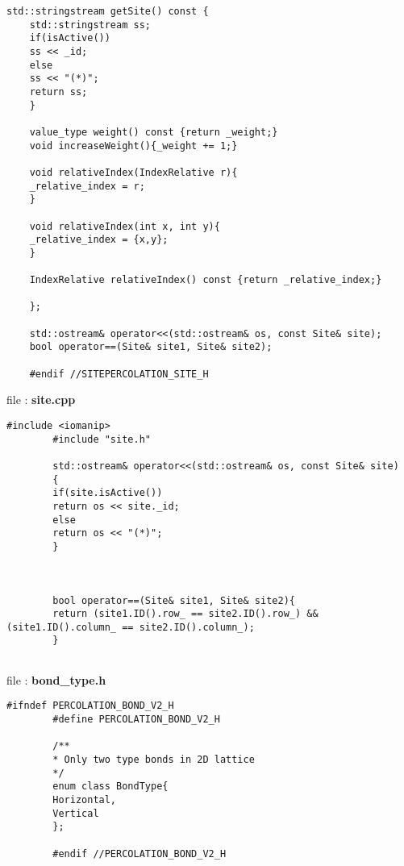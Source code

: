 \begin{lstlisting}[style=CStyle]
	std::stringstream getSite() const {
	std::stringstream ss;
	if(isActive())
	ss << _id;
	else
	ss << "(*)";
	return ss;
	}
	
	value_type weight() const {return _weight;}
	void increaseWeight(){_weight += 1;}
	
	void relativeIndex(IndexRelative r){
	_relative_index = r;
	}
	
	void relativeIndex(int x, int y){
	_relative_index = {x,y};
	}
	
	IndexRelative relativeIndex() const {return _relative_index;}
	
	};
	
	std::ostream& operator<<(std::ostream& os, const Site& site);
	bool operator==(Site& site1, Site& site2);
	
	#endif //SITEPERCOLATION_SITE_H
	\end{lstlisting}
	
	file : \textbf{site.cpp}
	\begin{lstlisting}[style=CStyle]
		#include <iomanip>
		#include "site.h"
		
		std::ostream& operator<<(std::ostream& os, const Site& site)
		{
		if(site.isActive())
		return os << site._id;
		else
		return os << "(*)";
		}
		
		
		
		bool operator==(Site& site1, Site& site2){
		return (site1.ID().row_ == site2.ID().row_) && (site1.ID().column_ == site2.ID().column_);
		}
		
	\end{lstlisting}
	
	
	file : \textbf{bond\_type.h}
	\begin{lstlisting}[style=CStyle]	
		#ifndef PERCOLATION_BOND_V2_H
		#define PERCOLATION_BOND_V2_H
		
		/**
		* Only two type bonds in 2D lattice
		*/
		enum class BondType{
		Horizontal,
		Vertical
		};

		#endif //PERCOLATION_BOND_V2_H
	\end{lstlisting}
	
